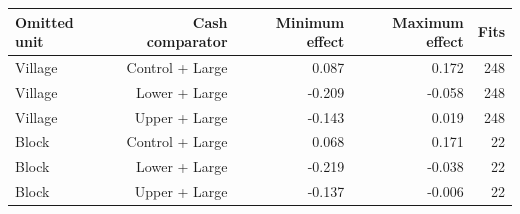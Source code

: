 \begin{tabular}{lrrrr}
\toprule
Omitted unit & Cash comparator & Minimum effect & Maximum effect & Fits \\
\midrule
Village & Control + Large & 0.087 & 0.172 & 248 \\
Village & Lower + Large & -0.209 & -0.058 & 248 \\
Village & Upper + Large & -0.143 & 0.019 & 248 \\
Block & Control + Large & 0.068 & 0.171 & 22 \\
Block & Lower + Large & -0.219 & -0.038 & 22 \\
Block & Upper + Large & -0.137 & -0.006 & 22 \\
\bottomrule
\end{tabular}
